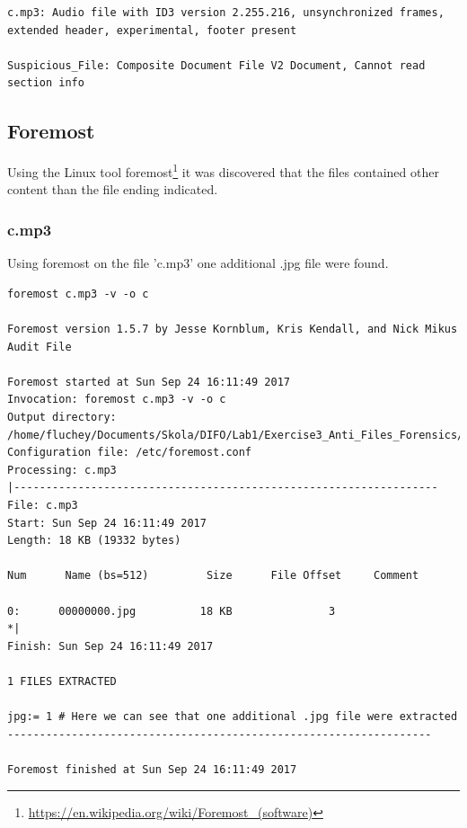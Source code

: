 \documentclass[a4paper,10pt,oneside]{article}
\begin{document}
\begin{lstlisting}[caption=Result from 'file' command]
c.mp3: Audio file with ID3 version 2.255.216, unsynchronized frames, extended header, experimental, footer present

Suspicious_File: Composite Document File V2 Document, Cannot read section info
\end{lstlisting}

\subsection{Foremost}
Using the Linux tool foremost\footnote{\url{https://en.wikipedia.org/wiki/Foremost_(software)}} it was discovered that the files contained other content than the file ending indicated.

\subsubsection{c.mp3}
Using foremost on the file 'c.mp3' one additional .jpg file were found.
\begin{lstlisting}[caption= foremost file 'c']
foremost c.mp3 -v -o c

Foremost version 1.5.7 by Jesse Kornblum, Kris Kendall, and Nick Mikus
Audit File

Foremost started at Sun Sep 24 16:11:49 2017
Invocation: foremost c.mp3 -v -o c
Output directory: /home/fluchey/Documents/Skola/DIFO/Lab1/Exercise3_Anti_Files_Forensics/c
Configuration file: /etc/foremost.conf
Processing: c.mp3
|------------------------------------------------------------------
File: c.mp3
Start: Sun Sep 24 16:11:49 2017
Length: 18 KB (19332 bytes)

Num      Name (bs=512)         Size      File Offset     Comment

0:      00000000.jpg          18 KB               3
*|
Finish: Sun Sep 24 16:11:49 2017

1 FILES EXTRACTED

jpg:= 1 # Here we can see that one additional .jpg file were extracted
------------------------------------------------------------------

Foremost finished at Sun Sep 24 16:11:49 2017
\end{lstlisting}
\end{document}
